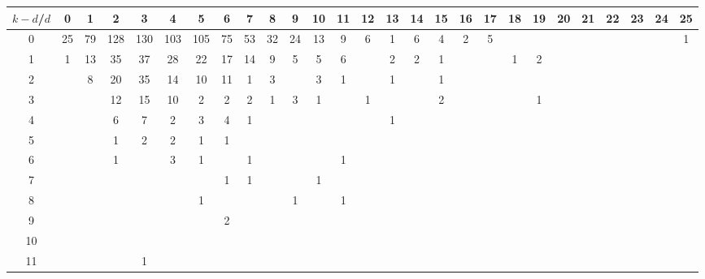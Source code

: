 \documentclass{article}[12pt]
\begin{document}
\begin{landscape}

\begin{table}[h]\footnotesize
{\centering
\begin{tabular}{|c|c|
c|c|c|c|c|c|c|c|c|c|c|c|c|c|c|c|c|c|c|c|c|c|c|c|c|}
  \hline
  $k-d$/$d$ 
 & 0 & 1 & 2 & 3 & 4 & 5 & 6 & 7 & 8 & 9 & 10 & 11 & 12 & 13 & 14 & 15 & 16 & 17 & 18 & 19 & 20 & 21 & 22 & 23 & 24 & 25\\

  \hline
  \hline

0  & 25 & 79 & 128 & 130 & 103 & 105 & 75 & 53 & 32 & 24 & 13 & 9 & 6 & 1 & 6 & 4 & 2 & 5 &  &  &  &  &  &  &  & 1\\

1  & 1 & 13 & 35 & 37 & 28 & 22 & 17 & 14 & 9 & 5 & 5 & 6 &  & 2 & 2 & 1 &  &  & 1 & 2 &  &  &  &  &  & \\

2  &  & 8 & 20 & 35 & 14 & 10 & 11 & 1 & 3 &  & 3 & 1 &  & 1 &  & 1 &  &  &  &  &  &  &  &  &  & \\

3  &  &  & 12 & 15 & 10 & 2 & 2 & 2 & 1 & 3 & 1 &  & 1 &  &  & 2 &  &  &  & 1 &  &  &  &  &  & \\

4  &  &  & 6 & 7 & 2 & 3 & 4 & 1 &  &  &  &  &  & 1 &  &  &  &  &  &  &  &  &  &  &  & \\

5  &  &  & 1 & 2 & 2 & 1 & 1 &  &  &  &  &  &  &  &  &  &  &  &  &  &  &  &  &  &  & \\

6  &  &  & 1 &  & 3 & 1 &  & 1 &  &  &  & 1 &  &  &  &  &  &  &  &  &  &  &  &  &  & \\

7  &  &  &  &  &  &  & 1 & 1 &  &  & 1 &  &  &  &  &  &  &  &  &  &  &  &  &  &  & \\

8  &  &  &  &  &  & 1 &  &  &  & 1 &  & 1 &  &  &  &  &  &  &  &  &  &  &  &  &  & \\

9  &  &  &  &  &  &  & 2 &  &  &  &  &  &  &  &  &  &  &  &  &  &  &  &  &  &  & \\

10  &  &  &  &  &  &  &  &  &  &  &  &  &  &  &  &  &  &  &  &  &  &  &  &  &  & \\

11  &  &  &  & 1 &  &  &  &  &  &  &  &  &  &  &  &  &  &  &  &  &  &  &  &  &  & \\


\end{tabular}}
\end{table}
\end{landscape}
\end{document}
